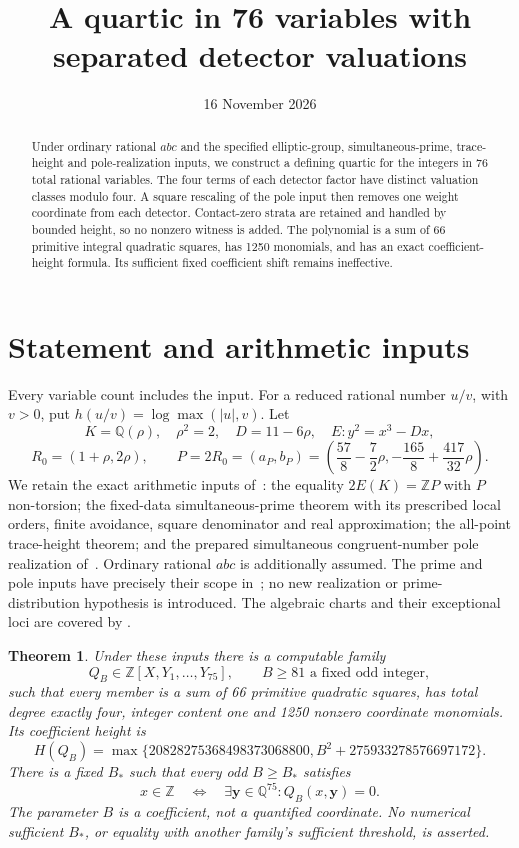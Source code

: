 \documentclass[11pt,a4paper]{article}
\title{A quartic in 76 variables with separated detector valuations}
\author{}\date{16 November 2026}
\newtheorem{theorem}{Theorem}[section]
\theoremstyle{remark}\newtheorem{remark}[theorem]{Remark}
\newcommand{\Q}{\mathbb Q}\newcommand{\Z}{\mathbb Z}
\begin{document}
\maketitle
\begin{abstract}
Under ordinary rational $abc$ and the specified elliptic-group,
simultaneous-prime, trace-height and pole-realization inputs, we construct
a defining quartic for the integers in 76 total rational variables.
The four terms of each detector factor have distinct valuation classes
modulo four. A square rescaling of the pole input then removes one
weight coordinate from each detector. Contact-zero strata are retained
and handled by bounded height, so no nonzero witness is added.
The polynomial is a sum of 66 primitive integral quadratic squares,
has 1250 monomials, and has an exact coefficient-height formula.
Its sufficient fixed coefficient shift remains ineffective.
\end{abstract}

\section{Statement and arithmetic inputs}
Every variable count includes the input. For a reduced rational number
$u/v$, with $v>0$, put $h(u/v)=\log\max(|u|,v)$.
Let
\[
 K=\Q(\rho),\quad\rho^2=2,\quad D=11-6\rho,
 \quad E:y^2=x^3-Dx,
\]
\[
 R_0=(1+\rho,2\rho),\qquad
 P=2R_0=(a_P,b_P)
 =\left(\frac{57}{8}-\frac72\rho,
          -\frac{165}{8}+\frac{417}{32}\rho\right).
\]
We retain the exact arithmetic inputs of~\cite{ABC78}: the equality
$2E(K)=\Z P$ with $P$ non-torsion; the fixed-data simultaneous-prime
theorem with its prescribed local orders, finite avoidance, square
denominator and real approximation; the all-point trace-height theorem;
and the prepared simultaneous congruent-number pole realization
of~\cite{Pole}. Ordinary rational $abc$ is additionally assumed.
The prime and pole inputs have precisely their scope in~\cite{ABC78};
no new realization or prime-distribution hypothesis is introduced.
The algebraic charts and their exceptional loci are covered by
\cite{Reference,Pair,Trace}.

\begin{theorem}\label{thm:main}
Under these inputs there is a computable family
\[
 Q_B\in\Z[X,Y_1,\ldots,Y_{75}],\qquad
 B\ge81\text{ a fixed odd integer},
\]
such that every member is a sum of 66 primitive quadratic squares,
has total degree exactly four, integer content one and 1250 nonzero
coordinate monomials. Its coefficient height is
\begin{equation}\label{eq:coefficientheight}
 H(Q_B)=\max\{20828275368498373068800,
                 B^2+275933278576697172\}.
\end{equation}
There is a fixed $B_*$ such that every odd $B\ge B_*$ satisfies
\[
 x\in\Z\quad\Longleftrightarrow\quad
 \exists\boldsymbol y\in\Q^{75}:Q_B(x,\boldsymbol y)=0.
\]
The parameter $B$ is a coefficient, not a quantified coordinate.
No numerical sufficient $B_*$, or equality with another family's
sufficient threshold, is asserted.
\end{theorem}
\end{document}
